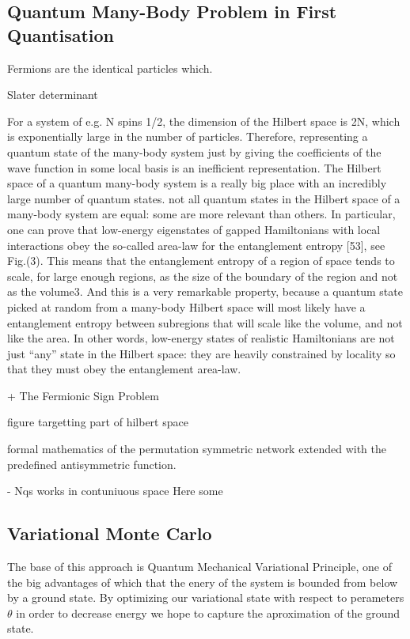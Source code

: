 \documentclass[a4paper,11pt,twoside]{article}
\begin{document}
\subsection{Quantum Many-Body Problem in First Quantisation}



Fermions are the identical particles which.

Slater determinant 

\cite{orus_practical_2014} For a system of e.g. N spins 1/2, the dimension of the Hilbert space is 2N, which
is exponentially large in the number of particles. Therefore, representing a quantum state of the
many-body system just by giving the coeﬃcients of the wave function in some local basis is an
ineﬃcient representation. The Hilbert space of a quantum many-body system is a really big place
with an incredibly large number of quantum states. not all quantum states in the Hilbert space of a many-body system are equal: some are more relevant than others. 
In particular, one can prove that low-energy eigenstates of gapped Hamiltonians with local interactions obey the so-called area-law for the entanglement entropy [53], see Fig.(3). This means that the entanglement entropy of a region of space tends to scale, for large enough regions, as the size of the boundary of the region and not as the volume3. And this is a very remarkable property, because a quantum state picked at random from a many-body Hilbert space will most likely have a entanglement entropy between subregions that will scale like the volume, and not like the area. In other words, low-energy states of realistic Hamiltonians are not just “any” state in the Hilbert space: they are heavily constrained by locality so that they must obey the entanglement area-law.



\cite{lange_architectures_2024} 


+ The Fermionic Sign Problem

figure targetting part of hilbert space 

 formal mathematics of the permutation symmetric network extended with the predefined antisymmetric function. 

- Nqs works in contuniuous space 
Here some
\newpage

\subsection{Variational Monte Carlo}

 The base of this approach is Quantum Mechanical Variational Principle, one of the big advantages of which that the enery of the system is bounded from below by a ground state. By optimizing our variational state with respect to perameters $\theta$ in order to decrease energy we hope to capture the aproximation of the ground state. 
\end{document}
